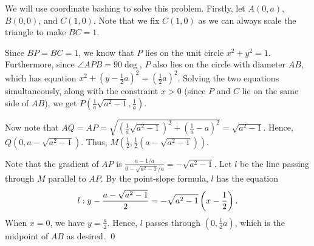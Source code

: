 \begin{solution*}
    We will use coordinate bashing to solve this problem. Firstly, let $A(0, a)$, $B(0, 0)$, and $C(1, 0)$. Note that we fix $C(1, 0)$ as we can always scale the triangle to make $BC = 1$.

    Since $BP = BC = 1$, we know that $P$ lies on the unit circle $x^2 + y^2 = 1$. Furthermore, since $\angle APB = 90\deg$, $P$ also lies on the circle with diameter $AB$, which has equation $x^2 + (y - \frac12 a)^2 = (\frac12 a)^2$. Solving the two equations simultaneously, along with the constraint $x > 0$ (since $P$ and $C$ lie on the same side of $AB$), we get $P(\frac1a \sqrt{a^2 - 1}, \frac1a)$.

    Now note that $AQ = AP = \sqrt{(\frac1a \sqrt{a^2 - 1})^2 + (\frac1a - a)^2} = \sqrt{a^2 - 1}$. Hence, $Q(0, a - \sqrt{a^2 - 1})$. Thus, $M(\frac12, \frac12 (a - \sqrt{a^2 - 1}))$.

    Note that the gradient of $AP$ is $\frac{a-1/a}{0 - \sqrt{a^2 - 1}/a} = -\sqrt{a^2 - 1}$. Let $l$ be the line passing through $M$ parallel to $AP$. By the point-slope formula, $l$ has the equation \[l : y - \frac{a-\sqrt{a^2 - 1}}{2} = -\sqrt{a^2 - 1} \left( x - \frac12 \right).\] When $x = 0$, we have $y = \frac{a}2$. Hence, $l$ passes through $(0, \frac12 a)$, which is the midpoint of $AB$ as desired. \qed

\end{solution*}

